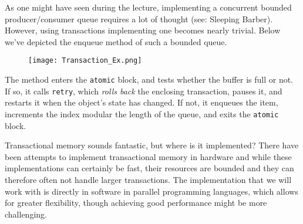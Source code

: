 \documentclass[main]{subfiles}
\begin{document}
\begin{example}
    As one might have seen during the lecture, implementing a concurrent bounded producer/consumer queue requires a lot of thought (see: Sleeping Barber). However, using transactions implementing one becomes nearly trivial. Below we've depicted the enqueue method of such a bounded queue.
    \begin{figure}[H]
        \centering
        \texttt{[image: Transaction\_Ex.png]}
    \end{figure}
    The method enters the \texttt{atomic} block, and tests whether the buffer is full or not. If so, it calls \texttt{retry}, which \textit{rolls back} the enclosing transaction, pauses it, and restarts it when the object's state has changed. If not, it enqueues the item, increments the index modular the length of the queue, and exits the \texttt{atomic} block.
\end{example}
Transactional memory sounds fantastic, but where is it implemented? There have been attempts to implement transactional memory in hardware and while these implementations can certainly be fast, their resources are bounded and they can therefore often not handle larger transactions. The implementation that we will work with is directly in software in parallel programming languages, which allows for greater flexibility, though achieving good performance might be more challenging.
\end{document}
